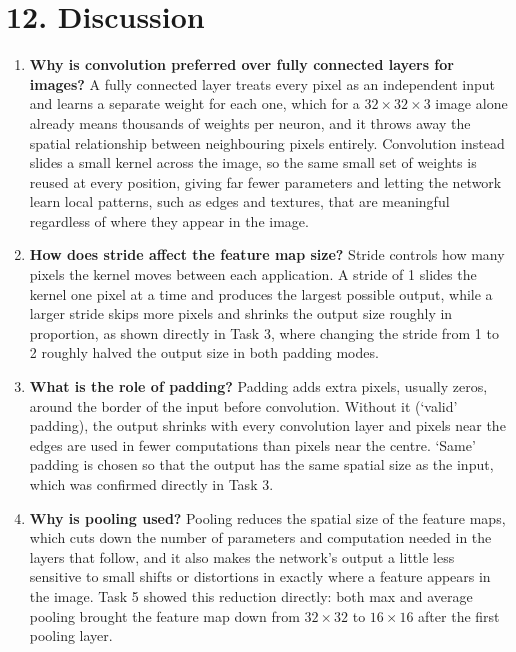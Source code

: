 \documentclass[11pt]{article}
\begin{document}

\section*{12. Discussion}

\begin{enumerate}

\item \textbf{Why is convolution preferred over fully connected layers
for images?}
A fully connected layer treats every pixel as an independent input and
learns a separate weight for each one, which for a $32\times32\times3$
image alone already means thousands of weights per neuron, and it throws
away the spatial relationship between neighbouring pixels entirely.
Convolution instead slides a small kernel across the image, so the same
small set of weights is reused at every position, giving far fewer
parameters and letting the network learn local patterns, such as edges
and textures, that are meaningful regardless of where they appear in the
image.

\item \textbf{How does stride affect the feature map size?}
Stride controls how many pixels the kernel moves between each
application. A stride of 1 slides the kernel one pixel at a time and
produces the largest possible output, while a larger stride skips more
pixels and shrinks the output size roughly in proportion, as shown
directly in Task 3, where changing the stride from 1 to 2 roughly halved
the output size in both padding modes.

\item \textbf{What is the role of padding?}
Padding adds extra pixels, usually zeros, around the border of the input
before convolution. Without it (`valid' padding), the output shrinks with
every convolution layer and pixels near the edges are used in fewer
computations than pixels near the centre. `Same' padding is chosen so
that the output has the same spatial size as the input, which was
confirmed directly in Task 3.

\item \textbf{Why is pooling used?}
Pooling reduces the spatial size of the feature maps, which cuts down the
number of parameters and computation needed in the layers that follow,
and it also makes the network's output a little less sensitive to small
shifts or distortions in exactly where a feature appears in the image.
Task 5 showed this reduction directly: both max and average pooling
brought the feature map down from $32\times32$ to $16\times16$ after the
first pooling layer.


\end{enumerate}
\end{document}
